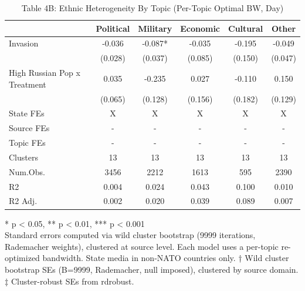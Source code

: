 \begin{table}[!t]
\caption{Table 4B: Ethnic Heterogeneity By Topic (Per-Topic Optimal BW, Day)} 
\fontsize{12.0pt}{14.4pt}\selectfont
\begin{tabular*}{\linewidth}{@{\extracolsep{\fill}}lccccc}
\toprule
  & Political & Military & Economic & Cultural & Other \\ 
\midrule\addlinespace[2.5pt]
Invasion & -0.036 & -0.087* & -0.035 & -0.195 & -0.049 \\ 
 & (0.028) & (0.037) & (0.085) & (0.150) & (0.047) \\ 
High Russian Pop x Treatment & 0.035 & -0.235 & 0.027 & -0.110 & 0.150 \\ 
{} & {(0.065)} & {(0.128)} & {(0.156)} & {(0.182)} & {(0.129)} \\ 
State FEs & X & X & X & X & X \\ 
Source FEs & - & - & - & - & - \\ 
Topic FEs & - & - & - & - & - \\ 
Clusters & 13 & 13 & 13 & 13 & 13 \\ 
Num.Obs. & 3456 & 2212 & 1613 & 595 & 2390 \\ 
R2 & 0.004 & 0.024 & 0.043 & 0.100 & 0.010 \\ 
R2 Adj. & 0.002 & 0.020 & 0.039 & 0.089 & 0.007 \\ 
\bottomrule
\end{tabular*}
\begin{minipage}{\linewidth}
* p < 0.05, ** p < 0.01, *** p < 0.001\\
Standard errors computed via wild cluster bootstrap (9999 iterations, Rademacher
weights), clustered at source level. Each model uses a per-topic re-optimized
bandwidth. State media in non-NATO countries only. † Wild cluster bootstrap SEs
(B=9999, Rademacher, null imposed), clustered by source domain. ‡ Cluster-robust
SEs from rdrobust.\\
\end{minipage}
\end{table}

